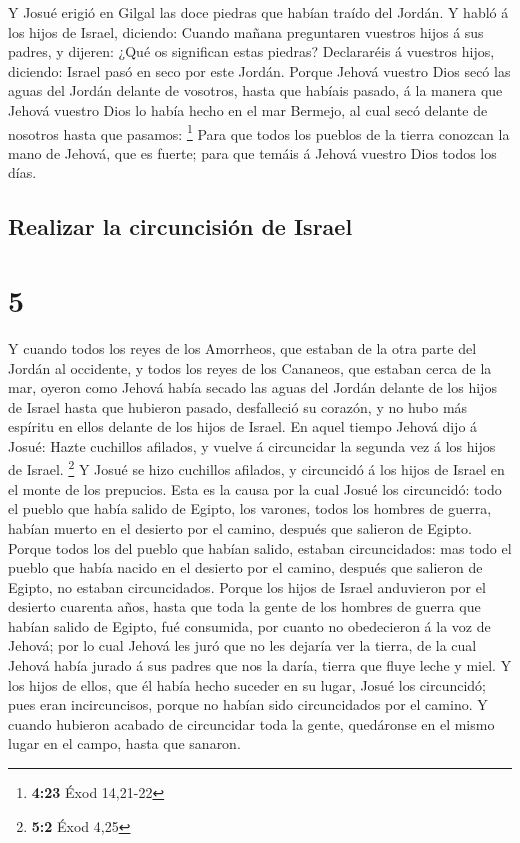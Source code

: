  Y Josué erigió en Gilgal las doce piedras que habían
traído del Jordán.  Y habló á los hijos de Israel,
diciendo: Cuando mañana preguntaren vuestros hijos á sus padres, y
dijeren: ¿Qué os significan estas piedras?  Declararéis á
vuestros hijos, diciendo: Israel pasó en seco por este Jordán.
 Porque Jehová vuestro Dios secó las aguas del Jordán
delante de vosotros, hasta que habíais pasado, á la manera que Jehová
vuestro Dios lo había hecho en el mar Bermejo, al cual secó delante de
nosotros hasta que pasamos: \footnote{\textbf{4:23} Éxod 14,21-22}
 Para que todos los pueblos de la tierra conozcan la mano
de Jehová, que es fuerte; para que temáis á Jehová vuestro Dios todos
los días.

\hypertarget{realizar-la-circuncisiuxf3n-de-israel}{%
\subsection{Realizar la circuncisión de
Israel}\label{realizar-la-circuncisiuxf3n-de-israel}}

\hypertarget{section-4}{%
\section{5}\label{section-4}}

 Y cuando todos los reyes de los Amorrheos, que estaban de
la otra parte del Jordán al occidente, y todos los reyes de los
Cananeos, que estaban cerca de la mar, oyeron como Jehová había secado
las aguas del Jordán delante de los hijos de Israel hasta que hubieron
pasado, desfalleció su corazón, y no hubo más espíritu en ellos delante
de los hijos de Israel.  En aquel tiempo Jehová dijo á
Josué: Hazte cuchillos afilados, y vuelve á circuncidar la segunda vez á
los hijos de Israel. \footnote{\textbf{5:2} Éxod 4,25}  Y
Josué se hizo cuchillos afilados, y circuncidó á los hijos de Israel en
el monte de los prepucios.  Esta es la causa por la cual
Josué los circuncidó: todo el pueblo que había salido de Egipto, los
varones, todos los hombres de guerra, habían muerto en el desierto por
el camino, después que salieron de Egipto.  Porque todos
los del pueblo que habían salido, estaban circuncidados: mas todo el
pueblo que había nacido en el desierto por el camino, después que
salieron de Egipto, no estaban circuncidados.  Porque los
hijos de Israel anduvieron por el desierto cuarenta años, hasta que toda
la gente de los hombres de guerra que habían salido de Egipto, fué
consumida, por cuanto no obedecieron á la voz de Jehová; por lo cual
Jehová les juró que no les dejaría ver la tierra, de la cual Jehová
había jurado á sus padres que nos la daría, tierra que fluye leche y
miel.  Y los hijos de ellos, que él había hecho suceder en
su lugar, Josué los circuncidó; pues eran incircuncisos, porque no
habían sido circuncidados por el camino.  Y cuando
hubieron acabado de circuncidar toda la gente, quedáronse en el mismo
lugar en el campo, hasta que sanaron.


